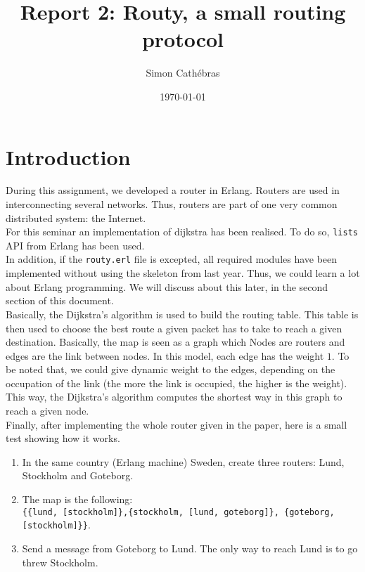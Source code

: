 \documentclass[a4paper, 11pt]{article}
\title{Report 2: Routy, a small routing protocol}
\author{Simon Cathébras}
\date{\today{}}
\begin{document}
\maketitle

\section{Introduction}


During this assignment, we developed a router in Erlang. Routers are used in interconnecting several networks. Thus, routers are part of one very common distributed system: the Internet.\\

For this seminar an implementation of dijkstra has been realised. To do so, \lstinline!lists! API from Erlang has been used. \\

In addition, if the \lstinline!routy.erl! file is excepted, all required modules have been implemented without using the skeleton from last year. Thus, we could learn a lot about Erlang programming. We will discuss about this later, in the second section of this document.\\

Basically, the Dijkstra's algorithm is used to build the routing table. This table is then used to choose the best route a given packet has to take to reach a given destination. Basically, the map is seen as a graph which Nodes are routers and edges are the link between nodes. In this model, each edge has the weight $1$. To be noted that, we could give dynamic weight to the edges, depending on the occupation of the link (the more the link is occupied, the higher is the weight). This way, the Dijkstra's algorithm computes the shortest way in this graph to reach a given node.\\

Finally, after implementing the whole router given in the paper, here is a small test showing how it works.\\

\newpage

\begin{enumerate}
\item In the same country (Erlang machine) Sweden, create three routers:
Lund, Stockholm and Goteborg.
\item The map is the following:\\ 
\lstinline!{{lund, [stockholm]},{stockholm, [lund, goteborg]}, {goteborg, [stockholm]}}!.
\item Send a message from Goteborg to Lund. The only way to reach Lund is to go threw Stockholm.
\end{enumerate}
\end{document}
